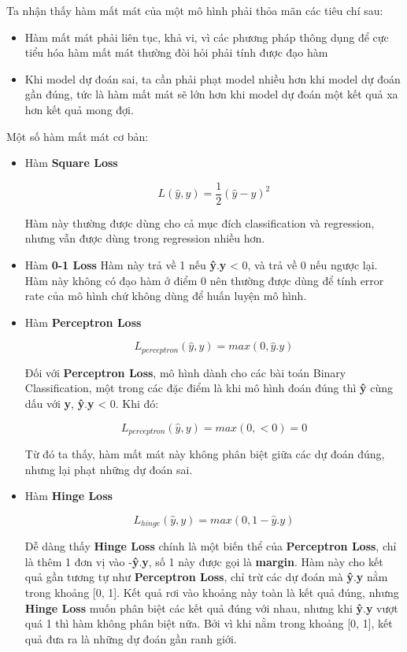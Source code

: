 Ta nhận thấy hàm mất mát của một mô hình phải thỏa mãn các tiêu chí sau:
\begin{itemize}
	\item Hàm mất mát phải liên tục, khả vi, vì các phương pháp thông dụng để cực tiểu hóa hàm mất mát thường đòi hỏi phải tính được đạo hàm
	\item Khi model dự đoán sai, ta cần phải phạt model nhiều hơn khi model dự đoán gần đúng, tức là hàm mất mát sẽ lớn hơn khi model dự đoán một kết quả xa hơn kết quả mong đợi.
\end{itemize}

Một số hàm mất mát cơ bản:
\begin{itemize}
	\item Hàm \textbf{Square Loss}
	\begin{center}
		\begin{equation}
			L(\hat{y}, y) = \frac{1}{2}(\hat{y} - y)^2
		\end{equation}
	\end{center}
	Hàm này thường được dùng cho cả mục đích classification và regression, nhưng vẫn được dùng trong regression nhiều hơn.
	\item Hàm \textbf{0-1 Loss}
	Hàm này trả về 1 nếu \textbf{\^{y}}.\textbf{y} < 0, và trả về 0 nếu ngược lại. Hàm này không có đạo hàm ở điểm 0 nên thường được dùng để tính error rate của mô hình chứ không dùng để huấn luyện mô hình.
	\item Hàm \textbf{Perceptron Loss}
	\begin{center}
		\begin{equation}
			L_{perceptron}(\hat{y}, y) = max(0, \hat{y}.y)
		\end{equation}
	\end{center}
	Đối với \textbf{Perceptron Loss}, mô hình dành cho các bài toán Binary Classification, một trong các đặc điểm là khi mô hình đoán đúng thì \textbf{\^{y}} cùng dấu với \textbf{y}, \textbf{\^{y}}.\textbf{y} < 0. Khi đó:
	\begin{center}
		\begin{equation}
			L_{perceptron}(\hat{y}, y) = max(0, <0) = 0
		\end{equation}
	\end{center}
	Từ đó ta thấy, hàm mất mát này không phân biệt giữa các dự đoán đúng, nhưng lại phạt những dự đoán sai.
	\item Hàm \textbf{Hinge Loss}
	\begin{center}
		\begin{equation}
			L_{hinge}(\hat{y}, y) = max(0, 1-\hat{y}.y)
		\end{equation}
	\end{center}
	Dễ dàng thấy \textbf{Hinge Loss} chính là một biến thể của \textbf{Perceptron Loss}, chỉ là thêm 1 đơn vị vào -\textbf{\^{y}}.\textbf{y}, số 1 này được gọi là \textbf{margin}. Hàm này cho kết quả gần tương tự như \textbf{Perceptron Loss}, chỉ trừ các dự đoán mà \textbf{\^{y}}.\textbf{y} nằm trong khoảng [0, 1]. Kết quả rơi vào khoảng này toàn là kết quả đúng, nhưng \textbf{Hinge Loss} muốn phân biệt các kết quả đúng với nhau, nhưng khi \textbf{\^{y}}.\textbf{y} vượt quá 1 thì hàm không phân biệt nữa. Bởi vì khi nằm trong khoảng [0, 1], kết quả đưa ra là những dự đoán gần ranh giới.
	

\end{itemize}
